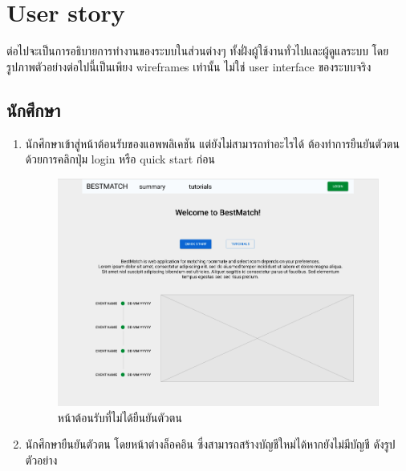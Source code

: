 \section{User story}
ต่อไปจะเป็นการอธิบายการทำงานของระบบในส่วนต่างๆ ทั้งฝั่งผู้ใช้งานทั่วไปและผู้ดูแลระบบ โดยรูปภาพตัวอย่างต่อไปนี้เป็นเพียง wireframes เท่านั้น ไม่ใช่ user interface ของระบบจริง
\subsection{นักศึกษา}
\begin{enumerate}
  \item นักศึกษาเข้าสู่หน้าต้อนรับของแอพพลิเคชัน แต่ยังไม่สามารถทำอะไรได้ ต้องทำการยืนยันตัวตนด้วยการคลิกปุ่ม login หรือ quick start ก่อน
        \begin{figure}[ht]
          \begin{center}
            \includegraphics[width=\linewidth]{photo/student/home.png}
          \end{center}
          \caption{หน้าต้อนรับที่ไม่ได้ยืนยันตัวตน}
          \label{fig:homepage}
        \end{figure}
        \clearpage
  \item นักศึกษายืนยันตัวตน โดยหน้าต่างล็อคอิน ซึ่งสามารถสร้างบัญชีใหม่ได้หากยังไม่มีบัญชี ดังรูปตัวอย่าง
        \begin{figure}[ht]
          \begin{center}

\end{center}
\end{figure}
\end{enumerate}
